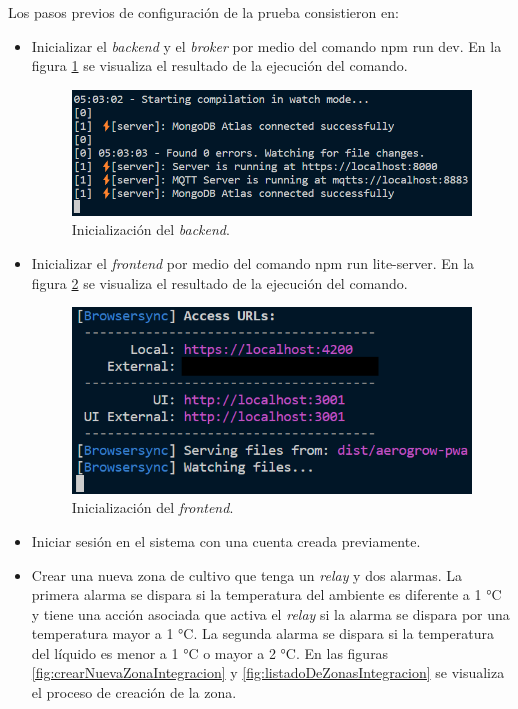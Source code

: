 Los pasos previos de configuración de la prueba consistieron en:

\begin{itemize}
	\item Inicializar el \textit{backend} y el \textit{broker} por medio del comando npm run dev. En la figura \ref{fig:inicializacionBackendIntegracion} se visualiza el resultado de la ejecución del comando.

\begin{figure}[H]
	\centering
	\includegraphics[width=.9\textwidth]{./Figures/Backend inicializacion.png}
	\caption{Inicialización del \emph{backend}.}
	\label{fig:inicializacionBackendIntegracion}
\end{figure}

	\item Inicializar el \textit{frontend} por medio del comando npm run lite-server. En la figura \ref{fig:inicializacionFrontendIntegracion} se visualiza el resultado de la ejecución del comando.

\begin{figure}[H]
	\centering
	\includegraphics[width=.9\textwidth]{./Figures/Frontend inicializacion.png}
	\caption{Inicialización del \emph{frontend}.}
	\label{fig:inicializacionFrontendIntegracion}
\end{figure}

	\item Iniciar sesión en el sistema con una cuenta creada previamente.
	\item Crear una nueva zona de cultivo que tenga un \textit{relay} y dos alarmas. La primera alarma se dispara si la temperatura del ambiente es diferente a 1 °C y tiene una acción asociada que activa el \textit{relay} si la alarma se dispara por una temperatura mayor a 1 °C. La segunda alarma se dispara si la temperatura del líquido es menor a 1 °C o mayor a 2 °C. En las figuras \ref{fig:crearNuevaZonaIntegracion} y \ref{fig:listadoDeZonasIntegracion} se visualiza el proceso de creación de la zona.
	

\end{itemize}
